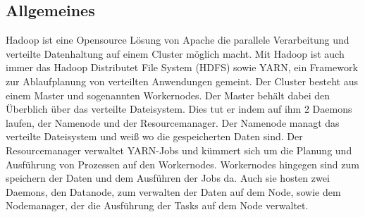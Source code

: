 \documentclass[12pt,oneside,a4paper,parskip]{scrbook}
\begin{document}
\subsection{Allgemeines}
Hadoop ist eine Opensource Lösung von Apache die parallele Verarbeitung und verteilte Datenhaltung auf einem Cluster möglich macht. Mit Hadoop ist auch immer das Hadoop Distributet File System (HDFS) sowie YARN, ein Framework zur Ablaufplanung von verteilten Anwendungen gemeint. \newline
Der Cluster besteht aus einem Master und sogenannten Workernodes. Der Master behält dabei den Überblich über das verteilte Dateisystem. Dies tut er indem auf ihm 2 Daemons laufen, der Namenode und der Resourcemanager. Der Namenode managt das verteilte Dateisystem und weiß wo die gespeicherten Daten sind. Der Resourcemanager verwaltet YARN-Jobs und kümmert sich um die Planung und Ausführung von Prozessen auf den Workernodes. \newline
Workernodes hingegen sind zum speichern der Daten und dem Ausführen der Jobs da. Auch sie hosten zwei Daemons, den Datanode, zum verwalten der Daten auf dem Node, sowie dem Nodemanager, der die Ausführung der Tasks auf dem Node verwaltet.
\end{document}
